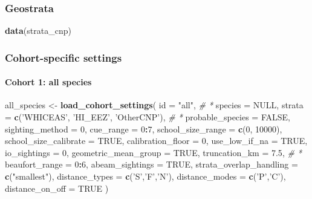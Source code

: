 \documentclass[
]{book}
\newenvironment{Shaded}{\begin{snugshade}}{\end{snugshade}}
\newcommand{\CommentTok}[1]{\textcolor[rgb]{0.56,0.35,0.01}{\textit{#1}}}
\newcommand{\DataTypeTok}[1]{\textcolor[rgb]{0.13,0.29,0.53}{#1}}
\newcommand{\DecValTok}[1]{\textcolor[rgb]{0.00,0.00,0.81}{#1}}
\newcommand{\FloatTok}[1]{\textcolor[rgb]{0.00,0.00,0.81}{#1}}
\newcommand{\KeywordTok}[1]{\textcolor[rgb]{0.13,0.29,0.53}{\textbf{#1}}}
\newcommand{\NormalTok}[1]{#1}
\newcommand{\OperatorTok}[1]{\textcolor[rgb]{0.81,0.36,0.00}{\textbf{#1}}}
\newcommand{\OtherTok}[1]{\textcolor[rgb]{0.56,0.35,0.01}{#1}}
\newcommand{\StringTok}[1]{\textcolor[rgb]{0.31,0.60,0.02}{#1}}
\begin{document}
\hypertarget{geostrata-1}{%
\subsubsection*{Geostrata}\label{geostrata-1}}

\begin{Shaded}
\begin{Highlighting}[]
\KeywordTok{data}\NormalTok{(strata_cnp)}
\end{Highlighting}
\end{Shaded}

\hypertarget{cohort-specific-settings-1}{%
\subsubsection*{Cohort-specific settings}\label{cohort-specific-settings-1}}

\hypertarget{cohort-1-all-species}{%
\paragraph{Cohort 1: all species}\label{cohort-1-all-species}}

\begin{Shaded}
\begin{Highlighting}[]
\NormalTok{all_species <-}\StringTok{ }\KeywordTok{load_cohort_settings}\NormalTok{(}
  \DataTypeTok{id =} \StringTok{"all"}\NormalTok{, }\CommentTok{# *}
  \DataTypeTok{species =} \OtherTok{NULL}\NormalTok{, }
  \DataTypeTok{strata =} \KeywordTok{c}\NormalTok{(}\StringTok{'WHICEAS'}\NormalTok{, }\StringTok{'HI_EEZ'}\NormalTok{, }\StringTok{'OtherCNP'}\NormalTok{), }\CommentTok{# *}
  \DataTypeTok{probable_species =} \OtherTok{FALSE}\NormalTok{,}
  \DataTypeTok{sighting_method =} \DecValTok{0}\NormalTok{,}
  \DataTypeTok{cue_range =} \DecValTok{0}\OperatorTok{:}\DecValTok{7}\NormalTok{,}
  \DataTypeTok{school_size_range =} \KeywordTok{c}\NormalTok{(}\DecValTok{0}\NormalTok{, }\DecValTok{10000}\NormalTok{),}
  \DataTypeTok{school_size_calibrate =} \OtherTok{TRUE}\NormalTok{,}
  \DataTypeTok{calibration_floor =} \DecValTok{0}\NormalTok{,}
  \DataTypeTok{use_low_if_na =} \OtherTok{TRUE}\NormalTok{,}
  \DataTypeTok{io_sightings =} \DecValTok{0}\NormalTok{,}
  \DataTypeTok{geometric_mean_group =} \OtherTok{TRUE}\NormalTok{,}
  \DataTypeTok{truncation_km =} \FloatTok{7.5}\NormalTok{, }\CommentTok{# *}
  \DataTypeTok{beaufort_range =} \DecValTok{0}\OperatorTok{:}\DecValTok{6}\NormalTok{,}
  \DataTypeTok{abeam_sightings =} \OtherTok{TRUE}\NormalTok{,}
  \DataTypeTok{strata_overlap_handling =} \KeywordTok{c}\NormalTok{(}\StringTok{"smallest"}\NormalTok{),}
  \DataTypeTok{distance_types =} \KeywordTok{c}\NormalTok{(}\StringTok{'S'}\NormalTok{,}\StringTok{'F'}\NormalTok{,}\StringTok{'N'}\NormalTok{),}
  \DataTypeTok{distance_modes =} \KeywordTok{c}\NormalTok{(}\StringTok{'P'}\NormalTok{,}\StringTok{'C'}\NormalTok{),}
  \DataTypeTok{distance_on_off =} \OtherTok{TRUE}
\NormalTok{)}
\end{Highlighting}
\end{Shaded}
\end{document}
